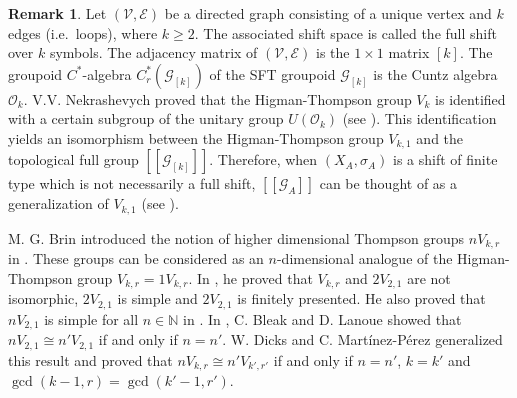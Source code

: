 \documentclass[11pt]{article}
\theoremstyle{definition}
\newtheorem{remark}[theorem]{Remark}
\numberwithin{equation}{section}
\newcommand{\G}{\mathcal{G}}
\newcommand{\N}{\mathbb{N}}
\begin{document}
\begin{remark}\label{highdimThomp}
Let $(\mathcal{V},\mathcal{E})$ be a directed graph 
consisting of a unique vertex and $k$ edges (i.e.\ loops), where $k\geq2$. 
The associated shift space is called the full shift over $k$ symbols. 
The adjacency matrix of $(\mathcal{V},\mathcal{E})$ is 
the $1\times 1$ matrix $[k]$. 
The groupoid $C^*$-algebra $C^*_r(\G_{[k]})$ of the SFT groupoid $\G_{[k]}$ 
is the Cuntz algebra $\mathcal{O}_k$. 
V.V. Nekrashevych proved that 
the Higman-Thompson group $V_k$ is identified with 
a certain subgroup of the unitary group $U(\mathcal{O}_k)$ 
(see \cite[Proposition 9.6]{Ne04JOP}). 
This identification yields an isomorphism 
between the Higman-Thompson group $V_{k,1}$ and 
the topological full group $[[\G_{[k]}]]$. 
Therefore, when $(X_A,\sigma_A)$ is a shift of finite type 
which is not necessarily a full shift, 
$[[\G_A]]$ can be thought of as a generalization of $V_{k,1}$ 
(see \cite[Remark 6.3]{M15crelle}). 

M. G. Brin introduced 
the notion of higher dimensional Thompson groups $nV_{k,r}$ 
in \cite[Section 4.2]{Brin04GeomD}. 
These groups can be considered as an $n$-dimensional analogue of 
the Higman-Thompson group $V_{k,r}=1V_{k,r}$. 
In \cite{Brin04GeomD, Brin05JAlg}, 
he proved that $V_{k,r}$ and $2V_{2,1}$ are not isomorphic, 
$2V_{2,1}$ is simple and $2V_{2,1}$ is finitely presented. 
He also proved that $nV_{2,1}$ is simple for all $n\in\N$ 
in \cite{Brin10PublMat}. 
In \cite{BL10GeomD}, C. Bleak and D. Lanoue showed that 
$nV_{2,1}\cong n'V_{2,1}$ if and only if $n=n'$. 
W. Dicks and C. Mart\'inez-P\'erez \cite{DMP14Israel} 
generalized this result and proved that 
$nV_{k,r}\cong n'V_{k',r'}$ if and only if 
$n=n'$, $k=k'$ and $\gcd(k{-}1,r)=\gcd(k'{-}1,r')$. 


\end{remark}
\end{document}
